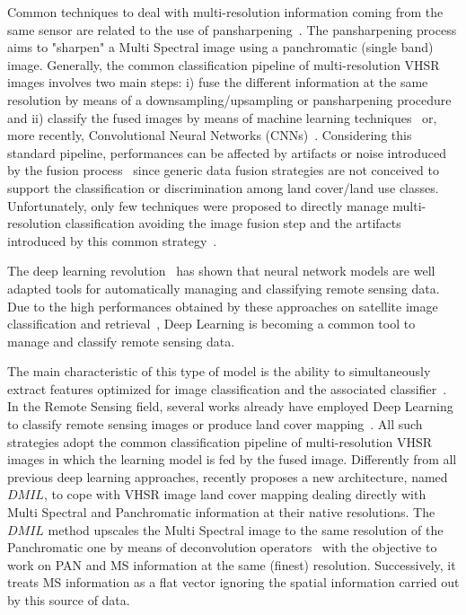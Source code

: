 \documentclass[journal]{IEEEtran}
\begin{document}
Common techniques to deal with multi-resolution information coming from the same sensor are related to the use of pansharpening~\cite{4505280,Colditz06}. The pansharpening process aims to "sharpen" a Multi Spectral image using a panchromatic (single band) image. Generally, the common classification pipeline of multi-resolution VHSR images involves two main steps: i) fuse the different information at the same resolution by means of a downsampling/upsampling or pansharpening procedure~\cite{Colditz06} and ii) classify the fused images by means of machine learning techniques~\cite{RegniersBLG16} or, more recently, Convolutional Neural Networks (CNNs)~\cite{MaggioriTCA17,VolpiT17}.
Considering this standard pipeline, performances can be affected by artifacts or noise introduced by the fusion process~\cite{Colditz06} since generic data fusion strategies are not conceived to support the classification or discrimination among land cover/land use classes. Unfortunately, only few techniques were proposed to directly manage multi-resolution classification avoiding the image fusion step and the artifacts introduced by this common strategy~\cite{WemmertPFG09,StorvikFS05,LiuJZZZLYT18}.

The deep learning revolution~\cite{Zhang16} has shown that neural network models are well adapted tools for automatically managing and classifying remote sensing data. Due to the high performances obtained by these approaches on satellite image classification and retrieval~\cite{DLiuWZZHF18,GuoYZH18,LiZHZM18}, Deep Learning is becoming a common tool to manage and classify remote sensing data.

The main characteristic of this type of model is the ability to simultaneously extract features optimized for image classification and the associated classifier~\cite{BengioCV13}. In the Remote Sensing field, several works already have employed Deep Learning to classify remote sensing images or produce land cover mapping~\cite{DLiuWZZHF18,GuoYZH18,TianLXM18,ScottESMD17}. All such strategies adopt the common classification pipeline of multi-resolution VHSR images in which the learning model is fed by the fused image.
Differently from all previous deep learning approaches, \cite{LiuJZZZLYT18} recently proposes a new architecture, named $DMIL$, to cope with VHSR image land cover mapping dealing directly with Multi Spectral and Panchromatic information at their native resolutions. The $DMIL$ method upscales the Multi Spectral image to the same resolution of the Panchromatic one by means of deconvolution operators~\cite{VolpiT17,AudebertSL16,NohHH15} with the objective to work on PAN and MS information at the same (finest) resolution. Successively, it treats MS information as a flat vector ignoring the spatial information carried out by this source of data.
\end{document}
